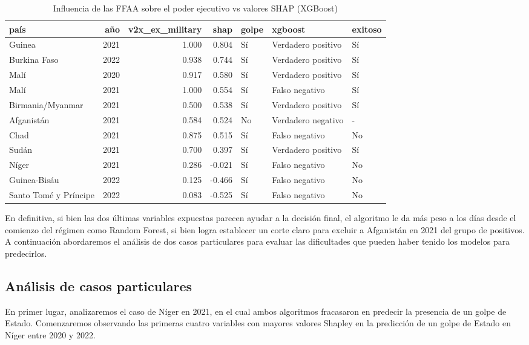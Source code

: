 \documentclass{article}
\begin{document}
\begin{table}[H]
    \centering
      \begin{tabular}{lrrrlll}
        \toprule
        país & año & v2x\_ex\_military & shap & golpe & xgboost & exitoso \\
        \midrule
        Guinea & 2021 & 1.000 & 0.804 & Sí & Verdadero positivo & Sí \\
        Burkina Faso & 2022 & 0.938 & 0.744 & Sí & Verdadero positivo & Sí \\
        Malí & 2020 & 0.917 & 0.580 & Sí & Verdadero positivo & Sí \\
        Malí & 2021 & 1.000 & 0.554 & Sí & Falso negativo & Sí \\
        Birmania/Myanmar & 2021 & 0.500 & 0.538 & Sí & Verdadero positivo & Sí \\
        Afganistán & 2021 & 0.584 & 0.524 & No & Verdadero negativo & - \\
        Chad & 2021 & 0.875 & 0.515 & Sí & Falso negativo & No \\
        Sudán & 2021 & 0.700 & 0.397 & Sí & Verdadero positivo & Sí \\
        Níger & 2021 & 0.286 & -0.021 & Sí & Falso negativo & No \\
        Guinea-Bisáu & 2022 & 0.125 & -0.466 & Sí & Falso negativo & No \\
        Santo Tomé y Príncipe & 2022 & 0.083 & -0.525 & Sí & Falso negativo & No \\
        \bottomrule
      \end{tabular}
    \caption{Influencia de las FFAA sobre el poder ejecutivo vs valores SHAP (XGBoost) \label{tab:shap_xgb_exmil}}
  \end{table}

En definitiva, si bien las dos últimas variables expuestas parecen ayudar a la decisión final, el 
algoritmo le da más peso a los días desde el comienzo del régimen como Random Forest, si bien logra
establecer un corte claro para excluir a Afganistán en 2021 del grupo de positivos. A continuación
abordaremos el análisis de dos casos particulares para evaluar las dificultades que pueden haber
tenido los modelos para predecirlos.

\subsection{Análisis de casos particulares}

En primer lugar, analizaremos el caso de Níger en 2021, en el cual ambos algoritmos fracasaron en 
predecir la presencia de un golpe de Estado. Comenzaremos observando las primeras cuatro variables
con mayores valores Shapley en la predicción de un golpe de Estado en Níger entre 2020 y 2022.
\end{document}
